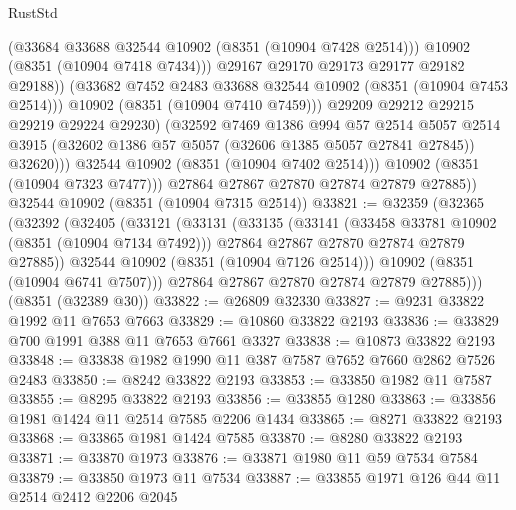 \begin{lexlean}{RustStd}
\begin{coremodule}
                          (@33684 @33688 @32544 @10902 (@8351 (@10904 @7428 @2514)))
                          @10902
                          (@8351 (@10904 @7418 @7434)))
                        @29167
                        @29170
                        @29173
                        @29177
                        @29182
                        @29188))
                    (@33682 @7452 @2483 @33688 @32544 @10902 (@8351 (@10904 @7453 @2514)))
                    @10902
                    (@8351 (@10904 @7410 @7459)))
                  @29209
                  @29212
                  @29215
                  @29219
                  @29224
                  @29230)
                (@32592
                  @7469
                  @1386
                  @994
                  @57
                  @2514
                  @5057
                  @2514
                  @3915
                  (@32602 @1386 @57 @5057 (@32606 @1385 @5057 @27841 @27845))
                  @32620)))
            @32544
            @10902
            (@8351 (@10904 @7402 @2514)))
          @10902
          (@8351 (@10904 @7323 @7477)))
        @27864
        @27867
        @27870
        @27874
        @27879
        @27885))
    @32544
    @10902
    (@8351 (@10904 @7315 @2514))
@33821 := @32359
    (@32365
      (@32392
        (@32405
          (@33121
            (@33131
              (@33135
                (@33141
                  (@33458 @33781 @10902 (@8351 (@10904 @7134 @7492)))
                  @27864
                  @27867
                  @27870
                  @27874
                  @27879
                  @27885))
              @32544
              @10902
              (@8351 (@10904 @7126 @2514)))
            @10902
            (@8351 (@10904 @6741 @7507)))
          @27864
          @27867
          @27870
          @27874
          @27879
          @27885)))
    (@8351 (@32389 @30))
@33822 := @26809 @32330
@33827 := @9231 @33822 @1992 @11 @7653 @7663
@33829 := @10860 @33822 @2193
@33836 := @33829 @700 @1991 @388 @11 @7653 @7661 @3327
@33838 := @10873 @33822 @2193
@33848 := @33838 @1982 @1990 @11 @387 @7587 @7652 @7660 @2862 @7526 @2483
@33850 := @8242 @33822 @2193
@33853 := @33850 @1982 @11 @7587
@33855 := @8295 @33822 @2193
@33856 := @33855 @1280
@33863 := @33856 @1981 @1424 @11 @2514 @7585 @2206 @1434
@33865 := @8271 @33822 @2193
@33868 := @33865 @1981 @1424 @7585
@33870 := @8280 @33822 @2193
@33871 := @33870 @1973
@33876 := @33871 @1980 @11 @59 @7534 @7584
@33879 := @33850 @1973 @11 @7534
@33887 := @33855 @1971 @126 @44 @11 @2514 @2412 @2206 @2045

\end{coremodule}
\end{lexlean}
